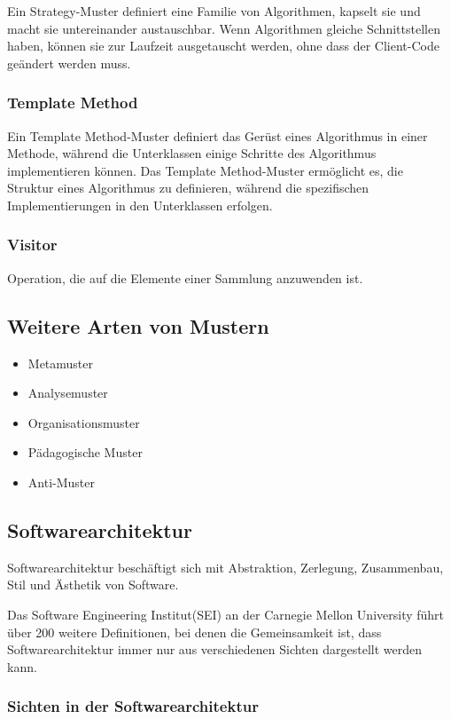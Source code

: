 \documentclass[12pt]{scrartcl}
\begin{document}
Ein Strategy-Muster definiert eine Familie von Algorithmen, kapselt sie und macht sie untereinander austauschbar. Wenn Algorithmen gleiche
Schnittstellen haben, können sie zur Laufzeit ausgetauscht werden, ohne dass der Client-Code geändert werden muss.

\subsubsection{Template Method}

Ein Template Method-Muster definiert das Gerüst eines Algorithmus in einer Methode, während die Unterklassen einige Schritte des Algorithmus implementieren können.
Das Template Method-Muster ermöglicht es, die Struktur eines Algorithmus zu definieren, während die spezifischen Implementierungen in den Unterklassen erfolgen.

\subsubsection{Visitor}

Operation, die auf die Elemente einer Sammlung anzuwenden ist.

\subsection{Weitere Arten von Mustern}

\begin{itemize}
	\item Metamuster
	\item Analysemuster
	\item Organisationsmuster
	\item Pädagogische Muster
	\item Anti-Muster
\end{itemize}

\subsection{Softwarearchitektur}

Softwarearchitektur beschäftigt sich mit Abstraktion, Zerlegung, Zusammenbau, Stil und Ästhetik von Software.

Das Software Engineering Institut(SEI) an der Carnegie Mellon University führt über 200 weitere Definitionen, bei denen
die Gemeinsamkeit ist, dass Softwarearchitektur immer nur aus verschiedenen Sichten dargestellt werden kann.

\subsubsection{Sichten in der Softwarearchitektur}
\end{document}

